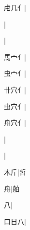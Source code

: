 \begin{multicols}{2}
{{\cjk{}虍几{亻}}\mktsJzrVerticalBar{}{\cjk{}{\cnsym{}　}{\cnsym{}　}{\cnsym{}　}}|{}\par
{}\mktsJzrVerticalBar{}{\cjk{}{\cnsym{}　}{\cnsym{}　}{\cnsym{}　}}|{}\par
{}\mktsJzrVerticalBar{}{\cjk{}{\cnsym{}　}{\cnsym{}　}{\cnsym{}　}}|{}\par
{\cjk{}馬{宀}{亻}}\mktsJzrVerticalBar{}{\cjk{}{\cnsym{}　}{\cnsym{}　}{\cnsym{}　}}|{}\par
{\cjk{}虫{宀}{亻}}\mktsJzrVerticalBar{}{\cjk{}{\cnsym{}　}{\cnsym{}　}{\cnsym{}　}}|{}\par
{\cjk{}卄穴{亻}}\mktsJzrVerticalBar{}{\cjk{}{\cnsym{}　}{\cnsym{}　}{\cnsym{}　}}|{}\par
{\cjk{}虫穴{亻}}\mktsJzrVerticalBar{}{\cjk{}{\cnsym{}　}{\cnsym{}　}{\cnsym{}　}}|{}\par
{\cjk{}舟穴{亻}}\mktsJzrVerticalBar{}{\cjk{}{\cnsym{}　}{\cnsym{}　}{\cnsym{}　}}|{}\par
{}|{}\par
{}\mktsJzrVerticalBar{}{\cjk{}{\cnsym{}　}{\cnsym{}　}{\cnsym{}　}}|{}\par
{\cjk{}{\cnsym{}　}木斤}\mktsJzrVerticalBar{}{\cjk{}{\cnsym{}　}{\cnsym{}　}{\cnsym{}　}}|{\cjk{}皙}\par
{\cjk{}{\cnsym{}　}{\cnsym{}　}舟}\mktsJzrVerticalBar{}{\cjk{}{\cnsym{}　}{\cnsym{}　}{\cnsym{}　}}|{\cjk{}舶}\par
{\cjk{}{\cnsym{}　}{\cnsym{}　}八}\mktsJzrVerticalBar{}{\cjk{}{\cnsym{}　}{\cnsym{}　}{\cnsym{}　}}|{}\par
{\cjk{}口日八}|{}\par
}
\end{multicols}
